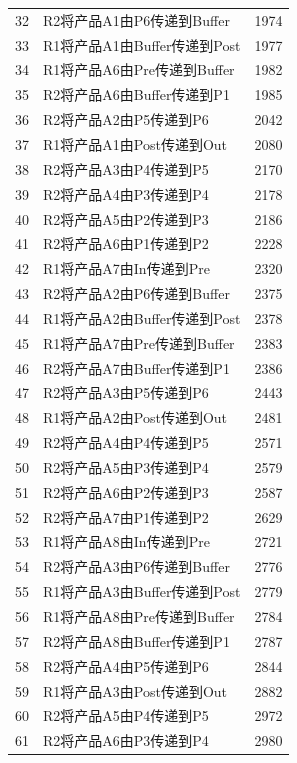 \documentclass{ctexart}
\begin{document}
{{\begin{longtable}{clc}
        32 & R2将产品A1由P6传递到Buffer & 1974 \\
        33 & R1将产品A1由Buffer传递到Post & 1977 \\
        34 & R1将产品A6由Pre传递到Buffer & 1982 \\
        35 & R2将产品A6由Buffer传递到P1 & 1985 \\
        36 & R2将产品A2由P5传递到P6 & 2042 \\
        37 & R1将产品A1由Post传递到Out & 2080 \\
        38 & R2将产品A3由P4传递到P5 & 2170 \\
        39 & R2将产品A4由P3传递到P4 & 2178 \\
        40 & R2将产品A5由P2传递到P3 & 2186 \\
        41 & R2将产品A6由P1传递到P2 & 2228 \\
        42 & R1将产品A7由In传递到Pre & 2320 \\
        43 & R2将产品A2由P6传递到Buffer & 2375 \\
        44 & R1将产品A2由Buffer传递到Post & 2378 \\
        45 & R1将产品A7由Pre传递到Buffer & 2383 \\
        46 & R2将产品A7由Buffer传递到P1 & 2386 \\
        47 & R2将产品A3由P5传递到P6 & 2443 \\
        48 & R1将产品A2由Post传递到Out & 2481 \\
        49 & R2将产品A4由P4传递到P5 & 2571 \\
        50 & R2将产品A5由P3传递到P4 & 2579 \\
        51 & R2将产品A6由P2传递到P3 & 2587 \\
        52 & R2将产品A7由P1传递到P2 & 2629 \\
        53 & R1将产品A8由In传递到Pre & 2721 \\
        54 & R2将产品A3由P6传递到Buffer & 2776 \\
        55 & R1将产品A3由Buffer传递到Post & 2779 \\
        56 & R1将产品A8由Pre传递到Buffer & 2784 \\
        57 & R2将产品A8由Buffer传递到P1 & 2787 \\
        58 & R2将产品A4由P5传递到P6 & 2844 \\
        59 & R1将产品A3由Post传递到Out & 2882 \\
        60 & R2将产品A5由P4传递到P5 & 2972 \\
        61 & R2将产品A6由P3传递到P4 & 2980 \\

\end{longtable}}}
\end{document}

